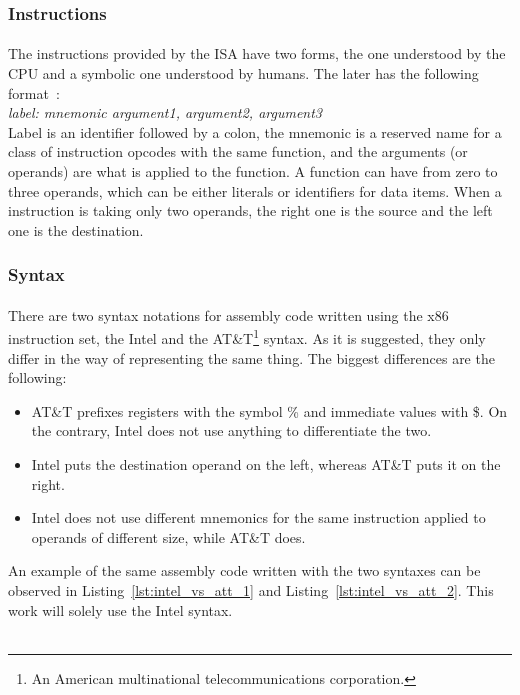 \subsubsection{Instructions} \label{sec:instructions}
\paragraph{}
The instructions provided by the ISA have two forms, the one understood by the CPU and a symbolic one understood by humans. The later has the following format~\cite{guide2011intel}:\\
\textit{label: mnemonic argument1, argument2, argument3}\\
Label is an identifier followed by a colon, the mnemonic is a reserved name for a class of instruction opcodes with the same function, and the arguments (or operands) are what is applied to the function. A function can have from zero to three operands, which can be either literals or identifiers for data items. When a instruction is taking only two operands, the right one is the source and the left one is the destination.

\subsubsection{Syntax} \label{sec:syntax}
\paragraph{}
There are two syntax notations for assembly code written using the x86 instruction set, the Intel and the AT\&T\footnote{An American multinational telecommunications corporation.} syntax. As it is suggested, they only differ in the way of representing the same thing. The biggest differences are the following:
\begin{itemize}
	\item AT\&T prefixes registers with the symbol \% and immediate values with \$. On the contrary, Intel does not use anything to differentiate the two.
	\item Intel puts the destination operand on the left, whereas AT\&T puts it on the right.
	\item Intel does not use different mnemonics for the same instruction applied to operands of different size, while AT\&T does.
\end{itemize}
An example of the same assembly code written with the two syntaxes can be observed in Listing~\ref{lst:intel_vs_att_1} and Listing~\ref{lst:intel_vs_att_2}. This work will solely use the Intel syntax.\\ \\

